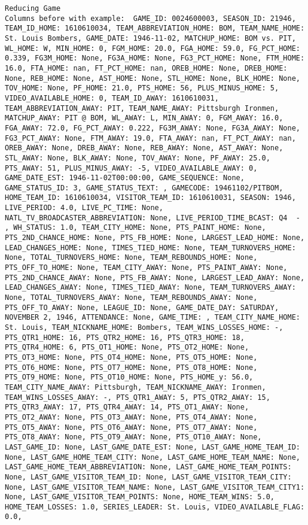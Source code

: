\documentclass{article}
\begin{document}
\begin{lstlisting}
Reducing Game 
Columns before with example:  GAME_ID: 0024600003, SEASON_ID: 21946, TEAM_ID_HOME: 1610610034, TEAM_ABBREVIATION_HOME: BOM, TEAM_NAME_HOME: St. Louis Bombers, GAME_DATE: 1946-11-02, MATCHUP_HOME: BOM vs. PIT, WL_HOME: W, MIN_HOME: 0, FGM_HOME: 20.0, FGA_HOME: 59.0, FG_PCT_HOME: 0.339, FG3M_HOME: None, FG3A_HOME: None, FG3_PCT_HOME: None, FTM_HOME: 16.0, FTA_HOME: nan, FT_PCT_HOME: nan, OREB_HOME: None, DREB_HOME: None, REB_HOME: None, AST_HOME: None, STL_HOME: None, BLK_HOME: None, TOV_HOME: None, PF_HOME: 21.0, PTS_HOME: 56, PLUS_MINUS_HOME: 5, VIDEO_AVAILABLE_HOME: 0, TEAM_ID_AWAY: 1610610031, TEAM_ABBREVIATION_AWAY: PIT, TEAM_NAME_AWAY: Pittsburgh Ironmen, MATCHUP_AWAY: PIT @ BOM, WL_AWAY: L, MIN_AWAY: 0, FGM_AWAY: 16.0, FGA_AWAY: 72.0, FG_PCT_AWAY: 0.222, FG3M_AWAY: None, FG3A_AWAY: None, FG3_PCT_AWAY: None, FTM_AWAY: 19.0, FTA_AWAY: nan, FT_PCT_AWAY: nan, OREB_AWAY: None, DREB_AWAY: None, REB_AWAY: None, AST_AWAY: None, STL_AWAY: None, BLK_AWAY: None, TOV_AWAY: None, PF_AWAY: 25.0, PTS_AWAY: 51, PLUS_MINUS_AWAY: -5, VIDEO_AVAILABLE_AWAY: 0, GAME_DATE_EST: 1946-11-02T00:00:00, GAME_SEQUENCE: None, GAME_STATUS_ID: 3, GAME_STATUS_TEXT: , GAMECODE: 19461102/PITBOM, HOME_TEAM_ID: 1610610034, VISITOR_TEAM_ID: 1610610031, SEASON: 1946, LIVE_PERIOD: 4.0, LIVE_PC_TIME: None, NATL_TV_BROADCASTER_ABBREVIATION: None, LIVE_PERIOD_TIME_BCAST: Q4  - , WH_STATUS: 1.0, TEAM_CITY_HOME: None, PTS_PAINT_HOME: None, PTS_2ND_CHANCE_HOME: None, PTS_FB_HOME: None, LARGEST_LEAD_HOME: None, LEAD_CHANGES_HOME: None, TIMES_TIED_HOME: None, TEAM_TURNOVERS_HOME: None, TOTAL_TURNOVERS_HOME: None, TEAM_REBOUNDS_HOME: None, PTS_OFF_TO_HOME: None, TEAM_CITY_AWAY: None, PTS_PAINT_AWAY: None, PTS_2ND_CHANCE_AWAY: None, PTS_FB_AWAY: None, LARGEST_LEAD_AWAY: None, LEAD_CHANGES_AWAY: None, TIMES_TIED_AWAY: None, TEAM_TURNOVERS_AWAY: None, TOTAL_TURNOVERS_AWAY: None, TEAM_REBOUNDS_AWAY: None, PTS_OFF_TO_AWAY: None, LEAGUE_ID: None, GAME_DATE_DAY: SATURDAY, NOVEMBER 2, 1946, ATTENDANCE: None, GAME_TIME: , TEAM_CITY_NAME_HOME: St. Louis, TEAM_NICKNAME_HOME: Bombers, TEAM_WINS_LOSSES_HOME: -, PTS_QTR1_HOME: 16, PTS_QTR2_HOME: 16, PTS_QTR3_HOME: 18, PTS_QTR4_HOME: 6, PTS_OT1_HOME: None, PTS_OT2_HOME: None, PTS_OT3_HOME: None, PTS_OT4_HOME: None, PTS_OT5_HOME: None, PTS_OT6_HOME: None, PTS_OT7_HOME: None, PTS_OT8_HOME: None, PTS_OT9_HOME: None, PTS_OT10_HOME: None, PTS_HOME_y: 56.0, TEAM_CITY_NAME_AWAY: Pittsburgh, TEAM_NICKNAME_AWAY: Ironmen, TEAM_WINS_LOSSES_AWAY: -, PTS_QTR1_AWAY: 5, PTS_QTR2_AWAY: 15, PTS_QTR3_AWAY: 17, PTS_QTR4_AWAY: 14, PTS_OT1_AWAY: None, PTS_OT2_AWAY: None, PTS_OT3_AWAY: None, PTS_OT4_AWAY: None, PTS_OT5_AWAY: None, PTS_OT6_AWAY: None, PTS_OT7_AWAY: None, PTS_OT8_AWAY: None, PTS_OT9_AWAY: None, PTS_OT10_AWAY: None, LAST_GAME_ID: None, LAST_GAME_DATE_EST: None, LAST_GAME_HOME_TEAM_ID: None, LAST_GAME_HOME_TEAM_CITY: None, LAST_GAME_HOME_TEAM_NAME: None, LAST_GAME_HOME_TEAM_ABBREVIATION: None, LAST_GAME_HOME_TEAM_POINTS: None, LAST_GAME_VISITOR_TEAM_ID: None, LAST_GAME_VISITOR_TEAM_CITY: None, LAST_GAME_VISITOR_TEAM_NAME: None, LAST_GAME_VISITOR_TEAM_CITY1: None, LAST_GAME_VISITOR_TEAM_POINTS: None, HOME_TEAM_WINS: 5.0, HOME_TEAM_LOSSES: 1.0, SERIES_LEADER: St. Louis, VIDEO_AVAILABLE_FLAG: 0.0, 
\end{lstlisting}
\end{document}
